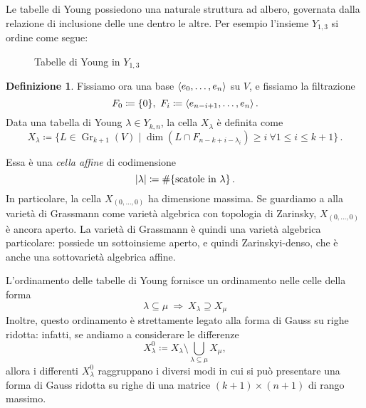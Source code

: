 \documentclass[a4paper, 11pt]{article}
\theoremstyle{definition}
\newtheorem{Def}{Definizione}[section]
\theoremstyle{plain}
\DeclarePairedDelimiter{\ang}{\langle}{\rangle}
\DeclarePairedDelimiter{\abs}{\lvert}{\rvert}
\newcommand{\deff}{\coloneqq}
\DeclareMathOperator{\Gr}{Gr}
\begin{document}
Le tabelle di Young possiedono una naturale struttura ad albero, governata dalla relazione di inclusione delle une dentro le altre. Per esempio l'insieme $Y_{1,3}$ si ordine come segue:\vspace{0.3cm}
\begin{figure}[h]
\centering
{}
\caption{Tabelle di Young in $Y_{1,3}$}
\label{fig:young2}
\end{figure}
\begin{Def}
Fissiamo ora una base $\ang{e_0, \dots, e_n}$ su $V$, e fissiamo la filtrazione
\[
	F_0 \deff \{0\},\ F_i \deff \ang{e_{n-i+1}, \dots, e_n}\,.
\] 
Data una tabella di Young $\lambda \in Y_{k,n}$, la cella $X_\lambda$ è definita come
\[
	X_\lambda \deff \{L \in \Gr_{k+1}(V) \mid \dim(L \cap F_{n-k+i-\lambda_i}) \ge i\ \forall 1 \le i \le k+1\}\,.
\]
\end{Def}
Essa è una \emph{cella affine} di codimensione 
\[
	\abs{\lambda} \deff \#\{\text{scatole in }\lambda\}\,.
\]
In particolare, la cella $X_{(0,\dots, 0)}$ ha dimensione massima. Se guardiamo a alla varietà di Grassmann come varietà algebrica con topologia di Zarinsky, $X_{(0,\dots, 0)}$ è ancora aperto. La varietà di Grassmann è quindi una varietà algebrica particolare: possiede un sottoinsieme aperto, e quindi Zarinskyi-denso, che è anche una sottovarietà algebrica affine.

L'ordinamento delle tabelle di Young fornisce un ordinamento nelle celle della forma
\[
	\lambda \subseteq \mu \ \Rightarrow\ X_\lambda \supseteq X_\mu
\]
Inoltre, questo ordinamento è strettamente legato alla forma di Gauss su righe ridotta: infatti, se andiamo a considerare le differenze
\[
	X_\lambda^0 \deff X_\lambda \setminus \bigcup_{\lambda \subseteq \mu} X_\mu,
\]
allora i differenti $X_\lambda^0$ raggruppano i diversi modi in cui si può presentare una forma di Gauss ridotta su righe di una matrice $(k+1)\times(n+1)$ di rango massimo. 
\end{document}
